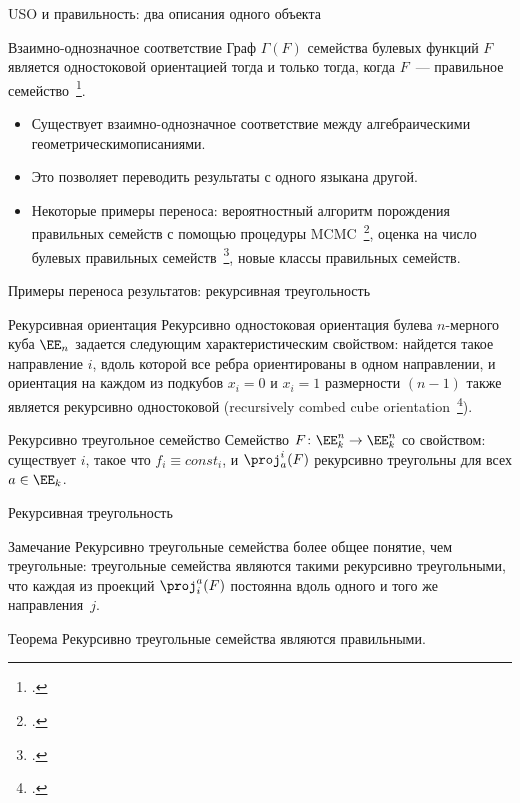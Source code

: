 \begin{frame}{USO и правильность: два описания одного объекта}  
    \begin{alertblock}{Взаимно-однозначное соответствие}
        Граф $\Gamma(F)$ семейства булевых функций $F$ является одностоковой ориентацией тогда и только тогда, когда $F$~--- правильное семейство~\footcite{intsys20, pdm20}.
    \end{alertblock}
    \pause
    \begin{itemize}
        \item Существует взаимно-однозначное соответствие между \guillemotleft алгебраическим\guillemotright и \guillemotleft геометрическим\guillemotright описаниями.
        \pause
        \item Это позволяет переводить результаты с одного \guillemotleft языка\guillemotright на другой.
        \pause
        \item Некоторые примеры переноса: вероятностный алгоритм порождения правильных семейств с помощью процедуры MCMC~\footcite{USOphd, galatenko21}, оценка на число булевых правильных семейств~\footcite{dm21}, новые классы правильных семейств.
    \end{itemize}    
\end{frame}


\begin{frame}{Примеры переноса результатов: рекурсивная треугольность}
    \begin{block}{Рекурсивная ориентация}
        Рекурсивно одностоковая ориентация булева $n$-мерного куба $\EE_n$ задается следующим характеристическим свойством: найдется такое направление $i$, вдоль которой все ребра ориентированы в одном направлении, и ориентация на каждом из подкубов $x_i = 0$ и $x_i = 1$ размерности $(n-1)$ также является рекурсивно одностоковой (recursively combed cube orientation~\footcite{gao2020new}).
    \end{block}
    \pause 
    \begin{alertblock}{Рекурсивно треугольное семейство}
        Семейство $F \colon \EE_k^n \to \EE_k^n$ со свойством: существует $i$, такое что $f_i \equiv const_i$, и $\proj_a^i(F)$ рекурсивно треугольны для всех $a \in \EE_k$.
    \end{alertblock}
\end{frame}


\begin{frame}{Рекурсивная треугольность}
    \begin{alertblock}{Замечание}
        Рекурсивно треугольные семейства более общее понятие, чем треугольные: треугольные семейства являются такими рекурсивно треугольными, что каждая из проекций $\proj^a_i(F)$ постоянна вдоль одного и того же направления~$j$.
    \end{alertblock}
    \pause
    \begin{alertblock}{Теорема}
        Рекурсивно треугольные семейства являются правильными.
    \end{alertblock}
\end{frame}


